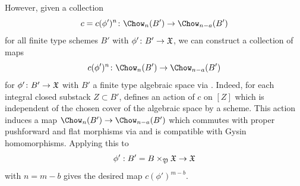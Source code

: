 \begin{remark}
However, given a collection
$$c= c(\phi')^{n}\colon \Chow_{n}(B') \to  \Chow_{n-a}(B') $$ for all finite type schemes $B'$ with $\phi'\colon B' \to \frak X$, we can construct  a collection of maps $${c}(\phi')^n\colon \Chow_{n}(B') \to \Chow_{n-a}(B')$$ for $\phi'\colon B' \to \frak X$ with $B'$ a finite type algebraic space via \cite[Section 5.1]{Vistoli1989Intersection-th}. Indeed, for each integral closed substack $Z \subset B'$, \cite[Section 5.1]{Vistoli1989Intersection-th} defines an action of $c$ on $[Z]$ which is independent of the chosen cover of the algebraic space by a scheme. This action induces a map
$\Chow_{n}(B') \to \Chow_{n-a}(B')$
which commutes with proper pushforward and flat morphisms via \cite[Lemma 5.3]{Vistoli1989Intersection-th} and is compatible with Gysin homomorphisms. Applying this to $$\phi' : B' = B \times_{\frak Y} \frak X \to \frak X$$
with $n=m-b$ gives the desired map ${c}(\phi')^{m-b}$.
\end{remark}


